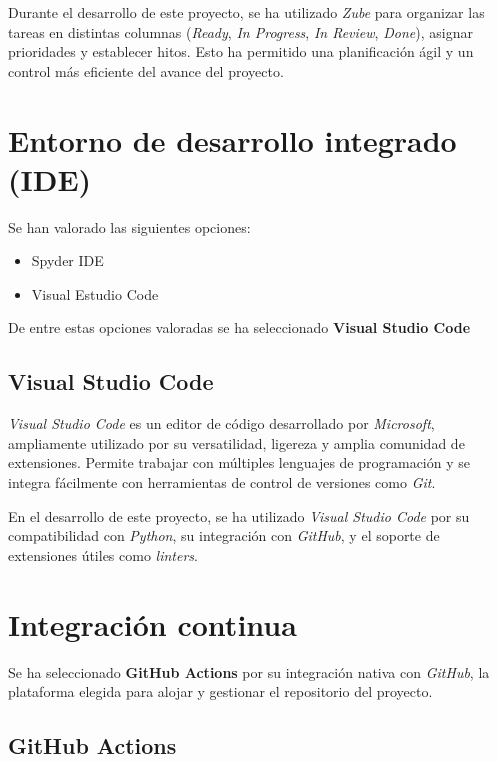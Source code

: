 Durante el desarrollo de este proyecto, se ha utilizado \textit{Zube} para organizar las tareas en distintas columnas 
(\textit{Ready}, \textit{In Progress}, \textit{In Review}, \textit{Done}), asignar prioridades y establecer hitos. Esto ha permitido una 
planificación ágil y un control más eficiente del avance del proyecto.

\section{Entorno de desarrollo integrado (IDE)}

Se han valorado las siguientes opciones:

\begin{itemize}
    \item Spyder IDE~\cite{web:spyder}
    \item Visual Estudio Code~\cite{web:vscode}
\end{itemize}

De entre estas opciones valoradas se ha seleccionado \textbf{Visual Studio Code}

\subsection{Visual Studio Code}

\textit{Visual Studio Code} es un editor de código desarrollado por \textit{Microsoft}, ampliamente utilizado por su versatilidad, 
ligereza y amplia comunidad de extensiones. Permite trabajar con múltiples lenguajes de programación y se integra fácilmente 
con herramientas de control de versiones como \textit{Git}.

En el desarrollo de este proyecto, se ha utilizado \textit{Visual Studio Code} por su compatibilidad con \textit{Python}, su integración con \textit{GitHub}, 
y el soporte de extensiones útiles como \textit{linters}.


\section{Integración continua}

Se ha seleccionado \textbf{GitHub Actions} por su integración nativa con \textit{GitHub}, 
la plataforma elegida para alojar y gestionar el repositorio del proyecto.

\subsection{GitHub Actions}

